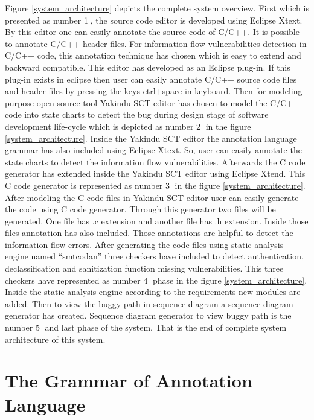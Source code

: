 Figure \ref{system_architecture} depicts the complete system overview. First which is presented as number \textcircled{1}, the source code editor is developed using Eclipse Xtext. By this editor one can easily annotate the source code of C/C++. It is possible to annotate C/C++ header files. For information flow vulnerabilities detection in C/C++ code, this annotation technique has chosen which is easy to extend and backward compatible. This editor has developed as an Eclipse plug-in. If this plug-in exists in eclipse then user can easily annotate C/C++ source code files and header files by pressing the keys ctrl+space in keyboard. Then for modeling purpose open source tool Yakindu SCT editor \cite{ref_15_yakindu:sct} has chosen to model the C/C++ code into state charts to detect the bug during design stage of software development life-cycle which is depicted as number \textcircled{2} in the figure \ref{system_architecture}. Inside the Yakindu SCT editor the annotation language grammar has also included using Eclipse Xtext. So, user can easily annotate the state charts to detect the information flow vulnerabilities. Afterwards the C code generator has extended inside the Yakindu SCT editor using Eclipse Xtend. This C code generator is represented as number \textcircled{3} in the figure \ref{system_architecture}. After modeling the C code files in Yakindu SCT editor user can easily generate the code using C code generator. Through this generator two files will be generated. One file has .c extension and another file has .h extension. Inside those files annotation has also included. Those annotations are helpful to detect the information flow errors. After generating the code files using static analysis engine named \enquote{smtcodan} three checkers have included to detect authentication, declassification and sanitization function missing vulnerabilities. This three checkers have represented as number \textcircled{4} phase in the figure \ref{system_architecture}. Inside the static analysis engine according to the requirements new modules are added. Then to view the buggy path in sequence diagram a sequence diagram generator has created. Sequence diagram generator to view buggy path is the number \textcircled{5} and last phase of the system. That is the end of complete system architecture of this system. 


\section{The Grammar of Annotation Language}

